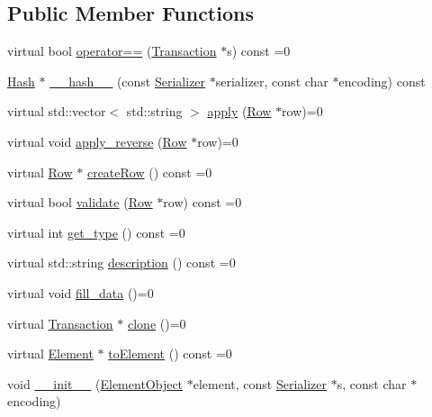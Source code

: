 \subsection*{Public Member Functions}
\begin{DoxyCompactItemize}
\item 
virtual bool \mbox{\hyperlink{classTransaction_a9a17c97fdcda6791484ad6d07b34470e}{operator==}} (\mbox{\hyperlink{classTransaction}{Transaction}} $\ast$s) const =0
\item 
\mbox{\hyperlink{classHash}{Hash}} $\ast$ \mbox{\hyperlink{classTransaction_a1f0df166c34d6a38a991544cf98c0356}{\+\_\+\+\_\+hash\+\_\+\+\_\+}} (const \mbox{\hyperlink{classSerializer}{Serializer}} $\ast$serializer, const char $\ast$encoding) const
\item 
virtual std\+::vector$<$ std\+::string $>$ \mbox{\hyperlink{classTransaction_a6ea269280c8cc641878f6e5775f270ca}{apply}} (\mbox{\hyperlink{classRow}{Row}} $\ast$row)=0
\item 
virtual void \mbox{\hyperlink{classTransaction_a1ef3b245f37c217f50f8f76fceebca4a}{apply\+\_\+reverse}} (\mbox{\hyperlink{classRow}{Row}} $\ast$row)=0
\item 
virtual \mbox{\hyperlink{classRow}{Row}} $\ast$ \mbox{\hyperlink{classTransaction_aa80b621537fe480dcb4444bba703abe5}{create\+Row}} () const =0
\item 
virtual bool \mbox{\hyperlink{classTransaction_a638518143f0defde1c3c73e33db1b7f1}{validate}} (\mbox{\hyperlink{classRow}{Row}} $\ast$row) const =0
\item 
virtual int \mbox{\hyperlink{classTransaction_a4cf9b81505b83a889bab80229f455589}{get\+\_\+type}} () const =0
\item 
virtual std\+::string \mbox{\hyperlink{classTransaction_ad27fb61fcd91863c57ba96a7159b4e8a}{description}} () const =0
\item 
virtual void \mbox{\hyperlink{classTransaction_a73b16e3d7e4c24e5b4da203740691e65}{fill\+\_\+data}} ()=0
\item 
virtual \mbox{\hyperlink{classTransaction}{Transaction}} $\ast$ \mbox{\hyperlink{classTransaction_ad6ee9c5e4067b2f5c950c6aad131b3e4}{clone}} ()=0
\item 
virtual \mbox{\hyperlink{classElement}{Element}} $\ast$ \mbox{\hyperlink{classComponent_a3e63d8c993e417a4af3f56d65ebfc7ea}{to\+Element}} () const =0
\item 
void \mbox{\hyperlink{classComponent_a28212595f8ee85fe009bd233bc99b2fc}{\+\_\+\+\_\+init\+\_\+\+\_\+}} (\mbox{\hyperlink{classElementObject}{Element\+Object}} $\ast$element, const \mbox{\hyperlink{classSerializer}{Serializer}} $\ast$s, const char $\ast$encoding)
\end{DoxyCompactItemize}
